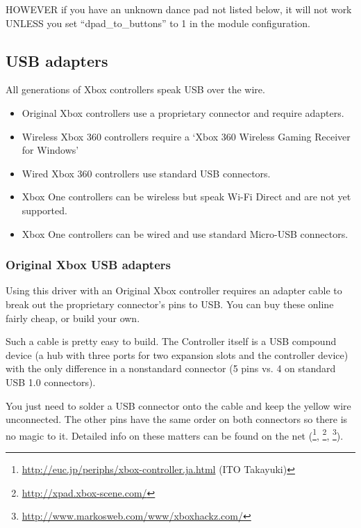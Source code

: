 \documentclass[a4paper,8pt,english]{sphinxmanual}
\begin{document}
HOWEVER if you have an unknown dance pad not listed below, it will not
work UNLESS you set ``dpad\_to\_buttons'' to 1 in the module configuration.


\subsection{USB adapters}
\label{input/devices/xpad:usb-adapters}
All generations of Xbox controllers speak USB over the wire.
\begin{itemize}
\item {} 
Original Xbox controllers use a proprietary connector and require adapters.

\item {} 
Wireless Xbox 360 controllers require a `Xbox 360 Wireless Gaming Receiver
for Windows'

\item {} 
Wired Xbox 360 controllers use standard USB connectors.

\item {} 
Xbox One controllers can be wireless but speak Wi-Fi Direct and are not
yet supported.

\item {} 
Xbox One controllers can be wired and use standard Micro-USB connectors.

\end{itemize}


\subsubsection{Original Xbox USB adapters}
\label{input/devices/xpad:original-xbox-usb-adapters}
Using this driver with an Original Xbox controller requires an
adapter cable to break out the proprietary connector's pins to USB.
You can buy these online fairly cheap, or build your own.

Such a cable is pretty easy to build. The Controller itself is a USB
compound device (a hub with three ports for two expansion slots and
the controller device) with the only difference in a nonstandard connector
(5 pins vs. 4 on standard USB 1.0 connectors).

You just need to solder a USB connector onto the cable and keep the
yellow wire unconnected. The other pins have the same order on both
connectors so there is no magic to it. Detailed info on these matters
can be found on the net (\footnote[1]{
\href{http://euc.jp/periphs/xbox-controller.ja.html}{http://euc.jp/periphs/xbox-controller.ja.html} (ITO Takayuki)
}, \footnote[2]{
\href{http://xpad.xbox-scene.com/}{http://xpad.xbox-scene.com/}
}, \footnote[3]{
\href{http://www.markosweb.com/www/xboxhackz.com/}{http://www.markosweb.com/www/xboxhackz.com/}
}).
\end{document}
